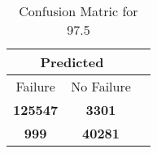 \begin{table}[] 
\label{Table: Prediction Accuracy-DMD97.5OnlySunEKF-resetReflection-Reflection} 
\caption{Confusion Matric for 97.5} 
\centering 
\begin{tabular} 
 {@{}ccc@{}} 
\toprule 
\multicolumn{2}{c}{\textbf{Predicted}}
 \\ \midrule 
\multicolumn{1}{|c|}{Failure} & 
\multicolumn{1}{c|}{No Failure}
 \\ \midrule 
\multicolumn{1}{|c|}{\color{green}\textbf{125547}} & 
\multicolumn{1}{c|}{\color{red}\textbf{3301}}
 \\ \midrule 
\multicolumn{1}{|c|}{\color{red}\textbf{999}} & 
\multicolumn{1}{c|}{\color{green}\textbf{40281}}
 \\ \bottomrule 
\end{tabular} 
\end{table} 
